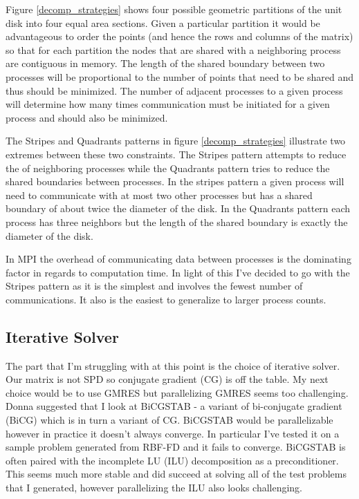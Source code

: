 \documentclass[12pt]{article}
\begin{document}
	 Figure \ref{decomp_strategies} shows four possible geometric partitions of the unit disk into four equal area sections. Given a particular partition it would be advantageous to order the points (and hence the rows and columns of the matrix) so that for each partition the nodes that are shared with a neighboring process are contiguous in memory. The length of the shared boundary between two processes will be proportional to the number of points that need to be shared and thus should be minimized. The number of adjacent processes to a given process will determine how many times communication must be initiated for a given process and should also be minimized. 
	 
	 The Stripes and Quadrants patterns in figure \ref{decomp_strategies} illustrate two extremes between these two constraints. The Stripes pattern attempts to reduce the of neighboring processes while the Quadrants pattern tries to reduce the shared boundaries between processes. In the stripes pattern a given process will need to communicate with at most two other processes but has a shared boundary of about twice the diameter of the disk. In the Quadrants pattern each process has three neighbors but the length of the shared boundary is exactly the diameter of the disk.
	 
	 In MPI the overhead of communicating data between processes is the dominating factor in regards to computation time. In light of this I've decided to go with the Stripes pattern as it is the simplest and involves the fewest number of communications. It also is the easiest to generalize to larger process counts.
	 
\subsection{Iterative Solver}
	The part that I'm struggling with at this point is the choice of iterative solver. Our matrix is not SPD so conjugate gradient (CG) is off the table. My next choice would be to use GMRES but parallelizing GMRES seems too challenging. Donna suggested that I look at BiCGSTAB - a variant of bi-conjugate gradient (BiCG) which is in turn a variant of CG. BiCGSTAB would be parallelizable however in practice it doesn't always converge. In particular I've tested it on a sample problem generated from RBF-FD and it fails to converge. BiCGSTAB is often paired with the incomplete LU (ILU) decomposition as a preconditioner. This seems much more stable and did succeed at solving all of the test problems that I generated, however parallelizing the ILU also looks challenging. 
	
\end{document}

